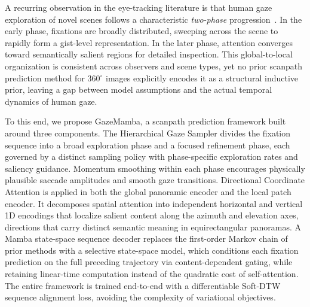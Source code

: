 \documentclass[sigconf]{acmart}
\begin{document}
A recurring observation in the eye-tracking literature is that human gaze exploration of novel scenes follows a characteristic \emph{two-phase} progression~\cite{unema2005time}. In the early phase, fixations are broadly distributed, sweeping across the scene to rapidly form a gist-level representation. In the later phase, attention converges toward semantically salient regions for detailed inspection. This global-to-local organization is consistent across observers and scene types, yet no prior scanpath prediction method for 360$^\circ$ images explicitly encodes it as a structural inductive prior, leaving a gap between model assumptions and the actual temporal dynamics of human gaze.

To this end, we propose GazeMamba, a scanpath prediction framework built around three components. The Hierarchical Gaze Sampler divides the fixation sequence into a broad exploration phase and a focused refinement phase, each governed by a distinct sampling policy with phase-specific exploration rates and saliency guidance. Momentum smoothing within each phase encourages physically plausible saccade amplitudes and smooth gaze transitions. Directional Coordinate Attention is applied in both the global panoramic encoder and the local patch encoder. It decomposes spatial attention into independent horizontal and vertical 1D encodings that localize salient content along the azimuth and elevation axes, directions that carry distinct semantic meaning in equirectangular panoramas. A Mamba state-space sequence decoder replaces the first-order Markov chain of prior methods with a selective state-space model, which conditions each fixation prediction on the full preceding trajectory via content-dependent gating, while retaining linear-time computation instead of the quadratic cost of self-attention. The entire framework is trained end-to-end with a differentiable Soft-DTW sequence alignment loss, avoiding the complexity of variational objectives.
\end{document}
